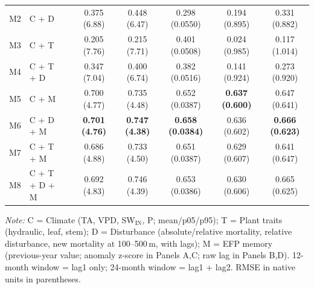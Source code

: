 \begin{table}[htbp]
\begin{tabular}{llcccccc}
M2 & C + D &  & 0.375 (6.88) & 0.448 (6.47) & 0.298 (0.0550) & 0.194 (0.895) & 0.331 (0.882) \\
M3 & C + T &  & 0.205 (7.76) & 0.215 (7.71) & 0.401 (0.0508) & 0.024 (0.985) & 0.117 (1.014) \\
M4 & C + T + D &  & 0.347 (7.04) & 0.400 (6.74) & 0.382 (0.0516) & 0.141 (0.924) & 0.273 (0.920) \\
M5 & C + M &  & 0.700 (4.77) & 0.735 (4.48) & 0.652 (0.0387) & \textbf{0.637 (0.600)} & 0.647 (0.641) \\
M6 & C + D + M &  & \textbf{0.701 (4.76)} & \textbf{0.747 (4.38)} & \textbf{0.658 (0.0384)} & 0.636 (0.602) & \textbf{0.666 (0.623)} \\
M7 & C + T + M &  & 0.686 (4.88) & 0.733 (4.50) & 0.651 (0.0387) & 0.629 (0.607) & 0.641 (0.647) \\
M8 & C + T + D + M &  & 0.692 (4.83) & 0.746 (4.39) & 0.653 (0.0386) & 0.630 (0.606) & 0.665 (0.625) \\
\midrule
\bottomrule
\end{tabular}
\vspace{2pt}
\begin{minipage}{\linewidth}
\footnotesize
\textit{Note:} C = Climate (TA, VPD, SW$_\mathrm{IN}$, P; mean/p05/p95); T = Plant traits (hydraulic, leaf, stem); D = Disturbance (absolute/relative mortality, relative disturbance, new mortality at 100--500\,m, with lags); M = EFP memory (previous-year value; anomaly z-score in Panels A,C; raw lag in Panels B,D). 12-month window = lag1 only; 24-month window = lag1 + lag2. RMSE in native units in parentheses.
\end{minipage}
\end{table}

